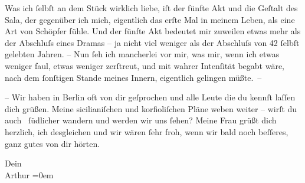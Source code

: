 \pstart
           Was ich ſelbſt an dem Stück
               wirklich liebe, iſt der fünfte Akt und die {\pb}Geſtalt des Sala, der gegenüber ich mich,
               eigentlich das erſte Mal in meinem Leben, als eine Art von Schöpfer fühle. Und der
               fünfte Akt bedeutet mir zuweilen etwas mehr als der Abschluſs eines Dramas – ja nicht
               viel weniger als der Abschluſs von 42 ſelbſt gelebten Jahren. \introOben{}–\introOben{} Nun ſeh ich mancherlei vor mir, was mir, wenn ich etwas weniger faul,
               etwas weniger zerſtreut, und mit \strikeout{\textcolor{gray}{×}\-\textcolor{gray}{×}\-\textcolor{gray}{×}\-\textcolor{gray}{×}-} wahrer Intenſität
               begabt wäre, nach dem ſonſtigen Stande meines Innern, eigentlich gelingen
               müßte. –\pend
           
\pstart
           {\pb}– Wir haben in Berlin oft von dir geſprochen und alle Leute die
               du kennſt laſſen dich grüßen. Meine sicilianiſchen und korfioliſchen Pläne
               weben weiter – wirſt du auch  ſüdlicher wandern und werden wir uns ſehen? Meine Frau grüßt dich herzlich, ich
               desgleichen und wir wären ſehr froh, wenn wir bald noch beſſeres, ganz gutes von dir
               hörten.\pend
           
\pstart
           Dein{\\[\baselineskip]}\spacefill\mbox{Arthur}\pend
           \leftskip=0em{}\endnumbering{}  
      
